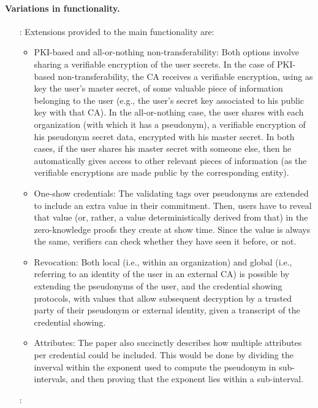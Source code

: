 \paragraph{Variations in functionality.}

\begin{enumerate}
\item[\cite{cl01}:] Extensions provided to the main functionality are:
  \begin{itemize}
  \item PKI-based and all-or-nothing non-transferability: Both options
    involve sharing a verifiable encryption of the user secrets. In the
    case of PKI-based non-transferability, the CA receives a verifiable
    encryption, using as key the user's master secret, of some valuable
    piece of information belonging to the user (e.g., the user's secret
    key associated to his public key with that CA). In the all-or-nothing
    case, the user shares with each organization (with which it has a
    pseudonym), a verifiable encryption of his pseudonym secret data, encrypted
    with his master secret. In both cases, if the user shares his master
    secret with someone else, then he automatically gives access to
    other relevant pieces of information (as the verifiable encryptions are
    made public by the corresponding entity).    
  \item One-show credentials: The validating tags over pseudonyms are extended
    to include an extra value in their commitment. Then, users have to reveal
    that value (or, rather, a value deterministically derived from that) in the
    zero-knowledge proofs they create at show time. Since the value is always
    the same, verifiers can check whether they have seen it before, or not.
  \item Revocation: Both local (i.e., within an organization) and global (i.e.,
    referring to an identity of the user in an external CA) is possible by
    extending the pseudonyms of the user, and the credential showing protocols,
    with values that allow subsequent decryption by a trusted party of their
    pseudonym or external identity, given a transcript of the credential
    showing.    
  \item Attributes: The paper also succinctly describes how multiple attributes
    per credential could be included. This would be done by dividing the inverval
    within the exponent used to compute the pseudonym in sub-intervals, and then
    proving that the exponent lies within a sub-interval.
  \end{itemize}
\item[\cite{cdhk15}:]
\end{enumerate}

